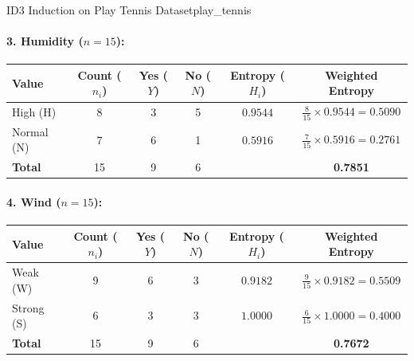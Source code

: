 \begin{example}{ID3 Induction on Play Tennis Dataset}{play_tennis}
\paragraph{3. Humidity ($n = 15$):}
\begin{center}\small\renewcommand{\arraystretch}{1.35}
\begin{tabular}{lccccc}
\toprule
\textbf{Value} & \textbf{Count ($n_i$)} & \textbf{Yes ($Y$)} & \textbf{No ($N$)} & \textbf{Entropy ($H_i$)} & \textbf{Weighted Entropy} \\
\midrule
High (H)   & 8 & 3 & 5 & $0.9544$ & $\frac{8}{15} \times 0.9544 = 0.5090$ \\
Normal (N) & 7 & 6 & 1 & $0.5916$ & $\frac{7}{15} \times 0.5916 = 0.2761$ \\
\midrule
\textbf{Total} & 15 & 9 & 6 & & \textbf{0.7851} \\
\bottomrule
\end{tabular}
\end{center}

\paragraph{4. Wind ($n = 15$):}
\begin{center}\small\renewcommand{\arraystretch}{1.35}
\begin{tabular}{lccccc}
\toprule
\textbf{Value} & \textbf{Count ($n_i$)} & \textbf{Yes ($Y$)} & \textbf{No ($N$)} & \textbf{Entropy ($H_i$)} & \textbf{Weighted Entropy} \\
\midrule
Weak (W)   & 9 & 6 & 3 & $0.9182$ & $\frac{9}{15} \times 0.9182 = 0.5509$ \\
Strong (S) & 6 & 3 & 3 & $1.0000$ & $\frac{6}{15} \times 1.0000 = 0.4000$ \\
\midrule
\textbf{Total} & 15 & 9 & 6 & & \textbf{0.7672} \\
\bottomrule
\end{tabular}
\end{center}


\end{example}
